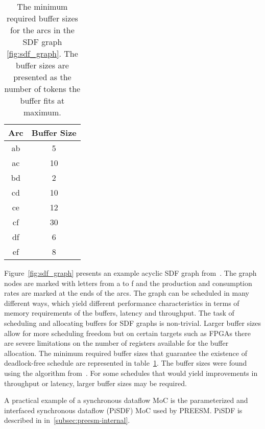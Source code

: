 \begin{table}
    \begin{center}
        \begin{tabular}{ c c }
            Arc & Buffer Size \\ \hline
            ab  & 5 \\ \hline
            ac  & 10 \\ \hline
            bd  & 2 \\ \hline
            cd  & 10 \\ \hline
            ce  & 12 \\ \hline
            cf  & 30 \\ \hline
            df  & 6 \\ \hline
            ef  & 8 \\ \hline
        \end{tabular}
        \caption{The minimum required buffer sizes for the arcs in the SDF graph \ref{fig:sdf_graph}. The buffer sizes are presented as the number of tokens the buffer fits at maximum.}
        \label{tab:sdf_buffers}
    \end{center}
\end{table}

Figure~\ref{fig:sdf_graph} presents an example acyclic SDF graph from~\cite{ade1997data}. The graph nodes are marked with letters from a to f and the production and consumption rates are marked at the ends of the arcs. The graph can be scheduled in many different ways, which yield different performance characteristics in terms of memory requirements of the buffers, latency and throughput. The task of scheduling and allocating buffers for SDF graphs is non-trivial. Larger buffer sizes allow for more scheduling freedom but on certain targets such as FPGAs there are severe limitations on the number of registers available for the buffer allocation. The minimum required buffer sizes that guarantee the existence of deadlock-free schedule are represented in table~\ref{tab:sdf_buffers}. The buffer sizes were found using the algorithm from~\cite{ade1997data}. For some schedules that would yield improvements in throughput or latency, larger buffer sizes may be required.

A practical example of a synchronous dataflow MoC is the parameterized and interfaced synchronous dataflow (PiSDF) MoC used by PREESM. PiSDF is described in in~\ref{subsec:preesm-internal}.

\FloatBarrier
